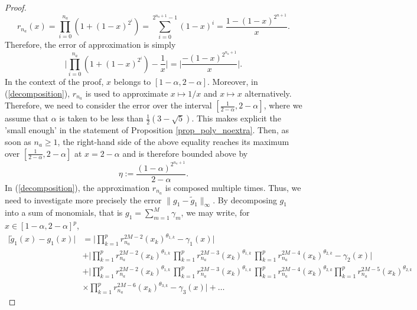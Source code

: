 \documentclass[anon,12pt]{colt2021} %
\begin{document}
\begin{proof}
\begin{equation*}
    r_{n_{a}}(x) = \prod_{i=0}^{n_{a}}(1+(1-x)^{2^{i}}) = \sum_{i=0}^{2^{n_{a}+1}-1} (1-x)^{i} = \frac{1- (1-x)^{2^{n+1}}}{x}.
\end{equation*}
Therefore, the error of approximation is simply
\begin{equation*}
    \big \vert \prod_{i=0}^{n_{a}}(1+(1-x)^{2^{i}}) - \frac{1}{x} \big \vert = \big \vert \frac{-(1-x)^{2^{n_{a}+1}}}{x} \big \vert.
\end{equation*}
In the context of the proof, $x$ belongs to $[1-\alpha, 2-\alpha]$. Moreover, in (\ref{decomposition}), $r_{n_{a}}$ is used to approximate $x \mapsto 1/x$ and $x \mapsto x$ alternatively. Therefore, we need to consider the error over the interval $[\frac{1}{2-\alpha}, 2-\alpha]$, where we assume that $\alpha$ is taken to be less than $\frac{1}{2}(3-\sqrt{5})$. This makes explicit the 'small enough' in the statement of Proposition \ref{prop_poly_noextra}. Then, as soon as $n_{a}\geq 1$, the right-hand side of the above equality reaches its maximum over $[\frac{1}{2-\alpha}, 2-\alpha]$ at $x=2-\alpha$ and is therefore bounded above by
\begin{equation} \label{defeta}
    \eta := \frac{(1-\alpha)^{2^{n_{a}+1}}}{2-\alpha}. 
\end{equation}
In (\ref{decomposition}), the approximation $r_{n_{a}}$ is composed multiple times. Thus, we need to investigate more precisely the error $\| g_{1} - \tilde g_{1} \|_{\infty}$. By decomposing $g_{1}$ into a sum of monomials, that is $g_{1}=\sum_{m=1}^{M} \gamma_{m}$, we may write, for $x \in [1-\alpha,2-\alpha]^{p}$,
\begin{align} \label{eqerrorR}
    \big \vert \tilde g_{1}(x) - g_{1}(x) \big \vert &= \big \vert \prod_{k=1}^{p} r_{n_{a}}^{2M-2}(x_{k})^{\theta_{1,k}} - \gamma_{1}(x) \big \vert \nonumber \\
    & + \big \vert \prod_{k=1}^{p} r_{n_{a}}^{2M-2}(x_{k})^{\theta_{1,k}} \, \prod_{k=1}^{p} r_{n_{a}}^{2M-3}(x_{k})^{\theta_{1,k}} \, \prod_{k=1}^{p} r_{n_{a}}^{2M-4}(x_{k})^{\theta_{2,k}} - \gamma_{2}(x) \big \vert \nonumber \\
    &+ \big \vert \prod_{k=1}^{p} r_{n_{a}}^{2M-2}(x_{k})^{\theta_{1,k}} \, \prod_{k=1}^{p} r_{n_{a}}^{2M-3}(x_{k})^{\theta_{1,k}} \, \prod_{k=1}^{p} r_{n_{a}}^{2M-4}(x_{k})^{\theta_{2,k}} \prod_{k=1}^{p} r_{n_{a}}^{2M-5}(x_{k})^{\theta_{2,k}} \nonumber \\
    &\times \prod_{k=1}^{p} r_{n_{a}}^{2M-6}(x_{k})^{\theta_{3,k}}- \gamma_{3}(x) \big \vert+ \dots
\end{align}

\end{proof}
\end{document}
